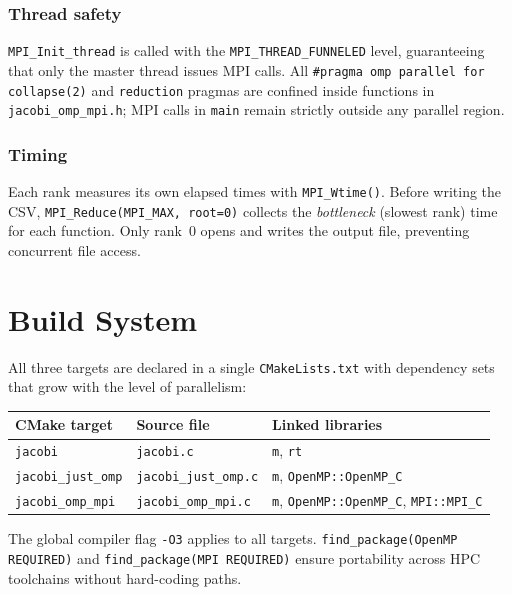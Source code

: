 \documentclass[11pt,a4paper]{article}
\begin{document}
\subsubsection{Thread safety}

\texttt{MPI\_Init\_thread} is called with the
\texttt{MPI\_THREAD\_FUNNELED} level, guaranteeing that only the master thread
issues MPI calls.  All \texttt{\#pragma omp parallel for collapse(2)} and
\texttt{reduction} pragmas are confined inside functions in
\texttt{jacobi\_omp\_mpi.h}; MPI calls in \texttt{main} remain strictly
outside any parallel region.

\subsubsection{Timing}

Each rank measures its own elapsed times with \texttt{MPI\_Wtime()}.
Before writing the CSV, \texttt{MPI\_Reduce(MPI\_MAX, root=0)} collects
the \emph{bottleneck} (slowest rank) time for each function.  
Only rank~0 opens and writes the output file, preventing concurrent file access.

\section{Build System}

All three targets are declared in a single \texttt{CMakeLists.txt}
with dependency sets that grow with the level of parallelism:

\begin{center}
\begin{tabular}{lll}
\toprule
CMake target       & Source file          & Linked libraries \\
\midrule
\texttt{jacobi}         & \texttt{jacobi.c}         & \texttt{m}, \texttt{rt} \\
\texttt{jacobi\_just\_omp}  & \texttt{jacobi\_just\_omp.c}  & \texttt{m}, \texttt{OpenMP::OpenMP\_C} \\
\texttt{jacobi\_omp\_mpi}   & \texttt{jacobi\_omp\_mpi.c}   & \texttt{m}, \texttt{OpenMP::OpenMP\_C}, \texttt{MPI::MPI\_C} \\
\bottomrule
\end{tabular}
\end{center}

\noindent
The global compiler flag \texttt{-O3} applies to all targets.
\texttt{find\_package(OpenMP REQUIRED)} and \texttt{find\_package(MPI REQUIRED)}
ensure portability across HPC toolchains without hard-coding paths.
\end{document}
